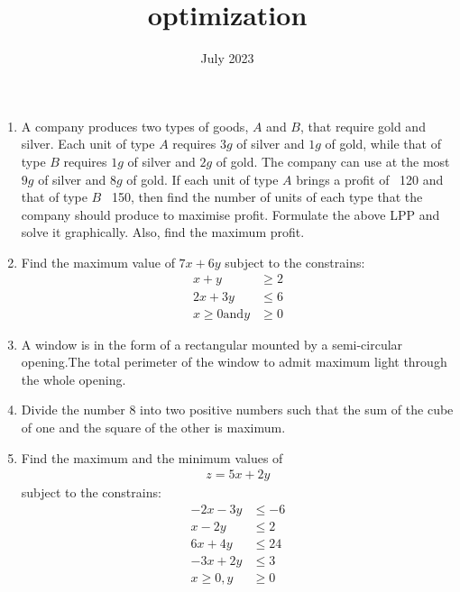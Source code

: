\documentclass{article}
\begin{document}
\begin{center}
\title{optimization}
\date{July 2023}
\maketitle     
\end{center}
\begin{enumerate}
  
\item A company produces two types of goods, $A$ and $B$, that require gold and
silver. Each unit of type $A$ requires $3g$ of silver and $1g$ of gold, while that of type $B$ requires $1g$ of silver and $2g$ of gold. The company can use at
the most $9g$ of silver and $8g$ of gold. If each unit of type $A$ brings a profit
of \rupee~120 and that of type $B$ \rupee~150, then find the number of units of each type that the company should produce to maximise profit. Formulate the above LPP and solve it graphically. Also, find the maximum profit.
\item Find the maximum value of $7x+6y$ subject to the constrains:
\begin{align}
	x+y &\geq   2\\
	2x+3y &\leq 6\\
	x \geq 0 \text{and} y &\geq 0
\end{align}
\item A window is in the form of a rectangular mounted by a semi-circular opening.The total perimeter of the window to admit maximum light through the whole opening.
\item Divide the number $8$ into two positive numbers such that the sum of the cube of one and the square of the other is maximum.
\item Find the maximum and the minimum values of 
\begin{align}
       z=5x+2y 
\end{align}	
		subject to the constrains:
\begin{align}
	-2x-3y &\leq -6\\
	x-2y &\leq 2\\
	6x+4y &\leq 24\\
	-3x+2y &\leq 3\\
	x \geq 0, y &\geq 0
\end{align}
 

\end{enumerate}
\end{document}
